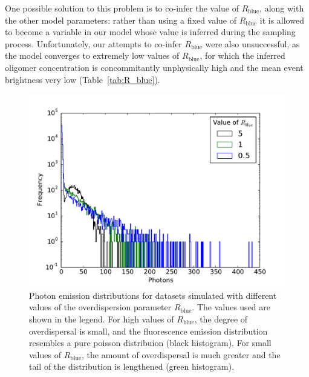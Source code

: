 One possible solution to this problem is to co-infer the value of $R_{\text{blue}}$, along with the other model parameters: rather than using a fixed value of $R_{\text{blue}}$ it is allowed to become a variable in our model whose value is inferred during the sampling process. Unfortunately, our attempts to co-infer $R_{\text{blue}}$ were also unsuccessful, as the model converges to extremely low values of $R_{\text{blue}}$, for which the inferred oligomer concentration is concommitantly unphysically high and the mean event brightness very low (Table~\ref{tab:R_blue}). 

\begin{figure}
   \begin{center}
      \includegraphics*[clip=true, width=6in]{sizing/varying_R_blue.pdf}
      \caption{Photon emission distributions for datasets simulated with different values of the overdispersion parameter $R_{\text{blue}}$. The values used are shown in the legend. For high values of $R_{\text{blue}}$, the degree of overdispersal is small, and the fluorescence emission distribution resembles a pure poisson distribuion (black histogram). For small values of $R_{\text{blue}}$, the amount of overdispersal is much greater and the tail of the distribution is lengthened (green histogram).} 
      \label{fig:R_blue}
   \end{center}
\end{figure}

